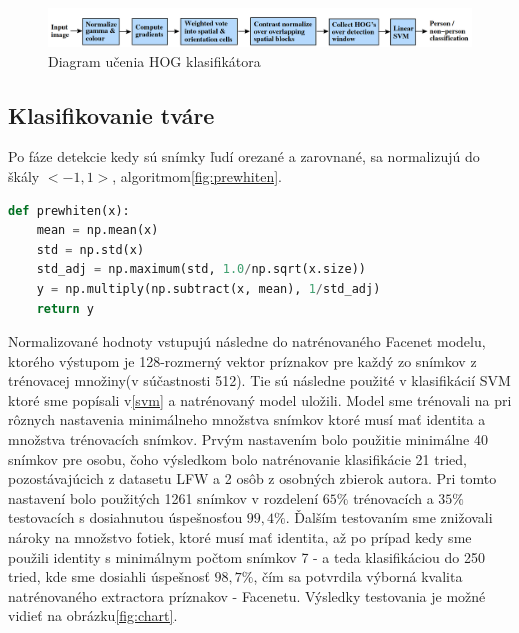 \begin{figure}[H]
	\centering
	\includegraphics[width=1\linewidth]{img/hog_class}
	\caption{Diagram učenia HOG klasifikátora \cite[s.~3]{dalal2005histograms}}
	\label{fig:hog_class}
\end{figure}

\subsection{Klasifikovanie tváre}
Po fáze detekcie kedy sú snímky ľudí orezané a zarovnané, sa normalizujú do škály $ <-1, 1> $, algoritmom\ref{fig:prewhiten}.

\begin{lstlisting}[language=Python, label={fig:prewhiten}, caption={Normalizácia tváre}]
def prewhiten(x):
	mean = np.mean(x)
	std = np.std(x)
	std_adj = np.maximum(std, 1.0/np.sqrt(x.size))
	y = np.multiply(np.subtract(x, mean), 1/std_adj)
	return y
\end{lstlisting}

\indent Normalizované hodnoty vstupujú následne do natrénovaného Facenet modelu, ktorého výstupom je 128-rozmerný vektor príznakov pre každý zo snímkov z trénovacej množiny(v súčastnosti 512).
Tie sú následne použité v klasifikácií SVM ktoré sme popísali v\ref{svm} a natrénovaný model uložili.
Model sme trénovali na pri rôznych nastavenia minimálneho množstva snímkov ktoré musí mať identita a množstva trénovacích snímkov.
Prvým nastavením bolo použitie minimálne 40 snímkov pre osobu, čoho výsledkom bolo natrénovanie klasifikácie 21 tried, pozostávajúcich z datasetu LFW a 2 osôb z osobných zbierok autora.
Pri tomto nastavení bolo použitých 1261 snímkov v rozdelení $ 65\% $ trénovacích a $ 35\% $ testovacích s dosiahnutou úspešnosťou $ 99,4\% $.
Ďalším testovaním sme znižovali nároky na množstvo fotiek, ktoré musí mať identita, až po prípad kedy sme použili identity s minimálnym počtom snímkov 7 - a teda klasifikáciou do 250 tried, kde sme dosiahli úspešnosť $ 98,7\% $, čím sa potvrdila výborná kvalita natrénovaného extractora príznakov - Facenetu.
Výsledky testovania je možné vidieť na obrázku\ref{fig:chart}.


